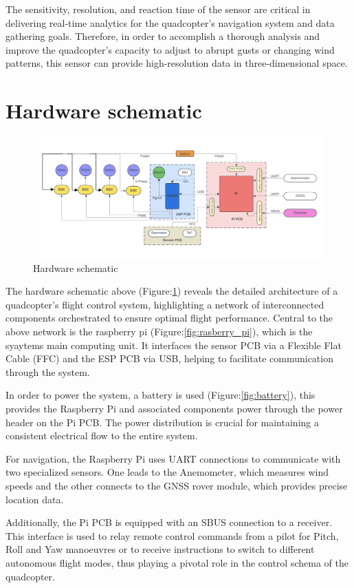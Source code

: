 \documentclass{report}
\begin{document}
The sensitivity, resolution, and reaction time of the sensor are critical in
delivering real-time analytics for the quadcopter's navigation system and data
gathering goals. Therefore, in order to accomplish a thorough analysis and
improve the quadcopter's capacity to adjust to abrupt gusts or changing wind
patterns, this sensor can provide high-resolution data in three-dimensional
space.
\section{Hardware schematic}
\begin{figure}[H]
  \centering
  \includegraphics[width=1\textwidth]{Pictures/Hardware_schematic.png}
  \caption{Hardware schematic}
  \label{fig:hardware_schematic}
\end{figure}

The hardware schematic above (Figure:\ref{fig:hardware_schematic}) reveals the
detailed architecture of a quadcopter's flight control system, highlighting a
network of interconnected components orchestrated to ensure optimal flight
performance. Central to the above network is the raspberry pi
(Figure:\ref{fig:rasberry_pi}), which is the syaytems main computing unit. It
interfaces the sensor PCB via a Flexible Flat Cable (FFC) and the ESP PCB via
USB, helping to facilitate communication through the system.

In order to power the system, a battery is used (Figure:\ref{fig:battery}), this
provides the Raspberry Pi and associated components power through the power
header on the Pi PCB. The power distribution is crucial for maintaining a
consistent electrical flow to the entire system.

For navigation, the Raspberry Pi uses UART connections to communicate with two
specialized sensors. One leads to the Anemometer, which measures wind speeds and
the other connects to the GNSS rover module, which provides precise location
data.

Additionally, the Pi PCB is equipped with an SBUS connection to a receiver. This
interface is used to relay remote control commands from a pilot for Pitch, Roll
and Yaw manoeuvres or to receive instructions to switch to different autonomous
flight modes, thus playing a pivotal role in the control schema of the
quadcopter.
\end{document}

